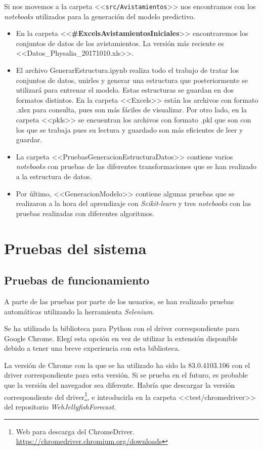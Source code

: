 Si nos movemos a la carpeta <<\texttt{src/Avistamientos}>> nos encontramos con los \emph{notebooks} utilizados para la generación del modelo predictivo.
\begin{itemize}
	\item En la carpeta <<\textbf{\#ExcelsAvistamientosIniciales}>> encontraremos los conjuntos de datos de los avistamientos. La versión más reciente es <<Datos\_Physalia\_20171010.xls>>.
	\item El archivo GenerarEstructura.ipynb realiza todo el trabajo de tratar los conjuntos de datos, unirles y generar una estructura que posteriormente se utilizará para entrenar el modelo. Estas estructuras se guardan en dos formatos distintos. En la carpeta <<Excels>> están los archivos con formato .xlsx para consulta, pues son más fáciles de visualizar. Por otro lado, en la carpeta <<pkls>> se encuentran los archivos con formato .pkl que son con los que se trabaja pues su lectura y guardado son más eficientes de leer y guardar.
	\item La carpeta <<PruebasGeneracionEstructuraDatos>> contiene varios \emph{notebooks} con pruebas de las diferentes transformaciones que se han realizado a la estructura de datos. 
	\item Por último, <<GeneracionModelo>> contiene algunas pruebas que se realizaron a la hora del aprendizaje con \emph{Scikit-learn} y tres \emph{notebooks} con las  pruebas realizadas con diferentes algoritmos.
\end{itemize}

\section{Pruebas del sistema}

\subsection{Pruebas de funcionamiento}
A parte de las pruebas por parte de los usuarios, se han realizado pruebas automáticas utilizando la herramienta \emph{Selenium}.

Se ha utilizado la biblioteca para Python con el driver correspondiente para Google Chrome. Elegí esta opción en vez de utilizar la extensión disponible debido a tener una breve experiencia con esta biblioteca. 

La versión de Chrome con la que se ha utilizado ha sido la 83.0.4103.106 con el driver correspondiente para esta versión. Si se prueba en el futuro, es probable que la versión del navegador sea diferente. Habría que descargar la versión correspondiente del driver\footnote{Web para descarga del ChromeDriver. \url{https://chromedriver.chromium.org/downloads}}, e introducirla en la carpeta <<test/chromedriver>> del repositorio \emph{WebJellyfishForecast}.

